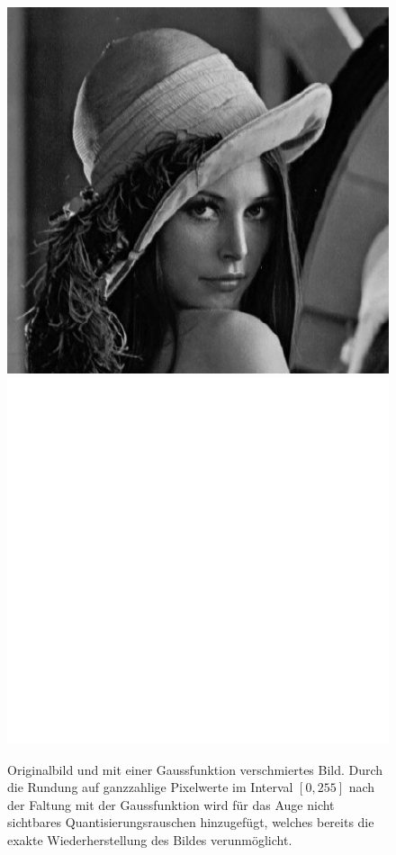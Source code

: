 \begin{figure}
\centering
\includegraphics[width=0.48\hsize]{8-filter/images/lena.jpg}
\quad
\includegraphics[width=0.48\hsize]{8-filter/images/lena-noisy.png}
\caption{Originalbild und mit einer Gaussfunktion verschmiertes Bild.
Durch die Rundung auf ganzzahlige Pixelwerte im Interval $[0,255]$
nach der Faltung mit der Gaussfunktion wird für das Auge nicht
sichtbares Quantisierungsrauschen hinzugefügt, welches bereits die
exakte Wiederherstellung des Bildes verunmöglicht.
\label{filter:wiener:figure:faltung}}
\end{figure}

